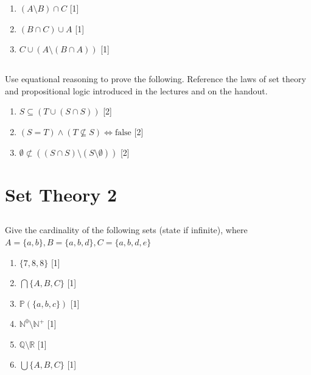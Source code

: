 \documentclass[twocolumn]{article}
\newcounter{pmarks}
\newcounter{marks}
\newcommand\mrk[1]{{\hfill\color{blue}\small[{#1}]}\addtocounter{pmarks}{#1}\addtocounter{marks}{#1}}
\begin{document}
    \begin{enumerate}
        \item $ (A \setminus B) \cap C$ \mrk{1}
        \item $ ( B \cap C ) \cup A $ \mrk{1}
        \item $ C \cup (A \setminus (B \cap A)) $ \mrk{1}
    \end{enumerate}

\subsection{}

Use equational reasoning to prove the following. Reference the laws of set theory and propositional logic introduced in the lectures and on the handout.

\begin{enumerate}
    \item $S \subseteq (T \cup (S \cap S)) $ \mrk{2}
    \item $ (S = T) \wedge (T \not\subseteq S) \Longleftrightarrow \text{false} $ \mrk{2}
    \item $ \emptyset \not\subset ((S \cap S) \setminus (S \setminus \emptyset)) $ \mrk{2}
\end{enumerate}

\clearpage
\setcounter{page}{8}
\setcounter{section}{7}
\section{Set Theory 2}

\subsection{}

    Give the cardinality of the following sets (state if infinite), where $ A = \{ a, b \}, B = \{ a, b, d\}, C = \{a, b, d, e \}$

    \begin{multicols}{2}
    \begin{enumerate}
        \item $\{ 7, 8, 8\}$ \mrk{1}
        \item $\bigcap \{ A, B, C \} $ \mrk{1}
        \item $\mathbb{P}(\{ a, b, c\})$ \mrk{1}
        \item $\mathbb{N}^0 \setminus \mathbb{N}^+$ \mrk{1}
        \item $\mathbb{Q} \setminus \mathbb{R}$ \mrk{1}
        \item $\bigcup \{ A, B, C \} $ \mrk{1}
    \end{enumerate}
\end{multicols}
\end{document}
